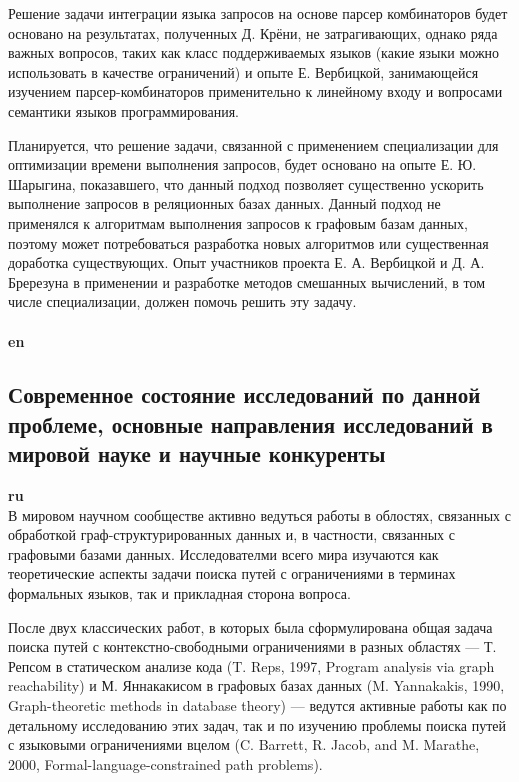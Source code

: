 \documentclass[12pt]{article}  %
\theoremstyle{remark}
\begin{document}
Решение задачи интеграции языка запросов на основе парсер комбинаторов будет основано на результатах, полученных Д. Крёни, не затрагивающих, однако ряда важных вопросов, таких как класс поддерживаемых языков (какие языки можно использовать в качестве ограничений) и опыте Е. Вербицкой, занимающейся изучением парсер-комбинаторов применительно к линейному входу и вопросами семантики языков программирования.

Планируется, что решение задачи, связанной с применением специализации для оптимизации времени выполнения запросов, будет основано на опыте Е. Ю. Шарыгина, показавшего, что данный подход позволяет существенно ускорить выполнение запросов в реляционных базах данных. Данный подход не применялся к алгоритмам выполнения запросов к графовым базам данных, поэтому может потребоваться разработка новых алгоритмов или существенная доработка существующих. Опыт участников проекта Е. А. Вербицкой и Д. А. Бререзуна в применении и разработке методов смешанных вычислений, в том числе специализации, должен помочь решить эту задачу.
\\
\\
\textbf{en}\\

\subsection{Современное состояние исследований по данной проблеме, основные направления исследований в мировой науке и научные конкуренты}

\textbf{ru}\\
%
В мировом научном сообществе активно ведуться работы в облостях, связанных с обработкой граф-структурированных данных и, в частности, связанных с графовыми базами данных. Исследователми всего мира изучаются как теоретические аспекты задачи поиска путей с ограничениями в терминах формальных языков, так и прикладная сторона вопроса.

После двух классических работ, в которых была сформулирована общая задача поиска путей с контекстно-свободными ограничениями в разных областях --- Т. Репсом в статическом анализе кода (T. Reps, 1997, Program analysis via graph reachability) и М. Яннакакисом в графовых базах данных (M. Yannakakis, 1990, Graph-theoretic methods in database theory) --- ведутся активные работы как по детальному исследованию этих задач, так и по изучению проблемы поиска путей с языковыми ограничениями вцелом (C. Barrett, R. Jacob, and M. Marathe, 2000, Formal-language-constrained path problems).
\end{document}
